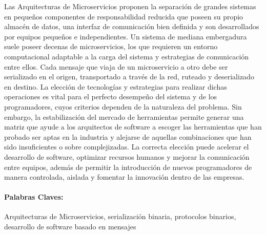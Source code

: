 
Las Arquitecturas de Microservicios proponen la separación de grandes sistemas en pequeños componentes de responsabilidad reducida que poseen su propio almacén de datos, una interfaz de comunicación bien definida y son desarrollados por equipos pequeños e independientes. Un sistema de mediana embergadura suele poseer decenas de microservicios, los que requieren un entorno computacional adaptable a la carga del sistema y estrategias de comunicación entre ellos.
Cada mensaje que viaja de un microservicio a otro debe ser serializado en el origen, transportado a través de la red, ruteado y deserializado en destino. La elección de tecnologías y estrategias para realizar dichas operaciones es vital para el perfecto desempeño del sistema y de los programadores, cuyos criterios dependen de la naturaleza del problema. Sin embargo, la estabilización del mercado de herramientas permite generar una matriz que ayude a los arquitectos de software a escoger las herramientas que han probado ser aptas en la industria y alejarse de aquellas combinaciones que han sido insuficientes o sobre complejizadas.
La correcta elección puede acelerar el desarrollo de software, optimizar recursos humanos y mejorar la comunicación entre equipos, además de permitir la introducción de nuevos programadores de manera controlada, aislada y fomentar la innovación dentro de las empresas.

\paragraph{Palabras Claves:} 
Arquitecturas de Microservicios, serialización binaria, protocolos binarios, desarrollo de software basado en mensajes

\vspace{20mm}
